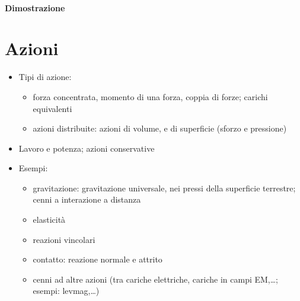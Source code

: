 \documentclass[letterpaper,10pt,italian]{jupyterBook}
\begin{document}
\subsubsection*{Dimostrazione}

\sphinxstepscope




\chapter{Azioni}
\label{\detokenize{ch/mechanics/actions:azioni}}\label{\detokenize{ch/mechanics/actions:physics-hs-mechanics-actions}}\label{\detokenize{ch/mechanics/actions::doc}}\begin{itemize}
\item {} 
\sphinxAtStartPar
Tipi di azione:
\begin{itemize}
\item {} 
\sphinxAtStartPar
forza concentrata, momento di una forza, coppia di forze; carichi equivalenti

\item {} 
\sphinxAtStartPar
azioni distribuite: azioni di volume, e di superficie (sforzo e pressione)

\end{itemize}

\item {} 
\sphinxAtStartPar
Lavoro e potenza; azioni conservative

\item {} 
\sphinxAtStartPar
Esempi:
\begin{itemize}
\item {} 
\sphinxAtStartPar
gravitazione: gravitazione universale, nei pressi della superficie terrestre; cenni a interazione a distanza

\item {} 
\sphinxAtStartPar
elasticità

\item {} 
\sphinxAtStartPar
reazioni vincolari

\item {} 
\sphinxAtStartPar
contatto: reazione normale e attrito

\item {} 
\sphinxAtStartPar
cenni ad altre azioni (tra cariche elettriche, cariche in campi EM,…; esempi: levmag,…)

\end{itemize}

\end{itemize}
\end{document}

